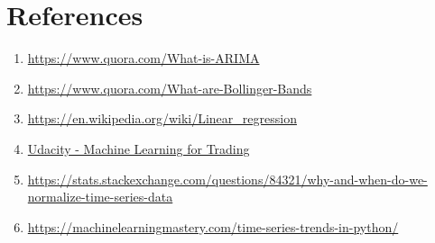 \documentclass[11pt]{article}
\providecommand{\tightlist}{%
      \setlength{\itemsep}{0pt}\setlength{\parskip}{0pt}}
\begin{document}
\section{References}\label{references}

\begin{enumerate}
\def\labelenumi{\arabic{enumi}.}
\tightlist
\item
  \url{https://www.quora.com/What-is-ARIMA}
\item
  \url{https://www.quora.com/What-are-Bollinger-Bands}
\item
  \url{https://en.wikipedia.org/wiki/Linear_regression}
\item
  \href{https://www.udacity.com/course/machine-learning-for-trading--ud501}{Udacity
  - Machine Learning for Trading}
\item
  \href{https://stats.stackexchange.com/questions/84321/why-and-when-do-we-normalize}{https://stats.stackexchange.com/questions/84321/why-and-when-do-we-normalize-time-series-data}
\item
  \url{https://machinelearningmastery.com/time-series-trends-in-python/}
\end{enumerate}


    
    
    
    
\end{document}
